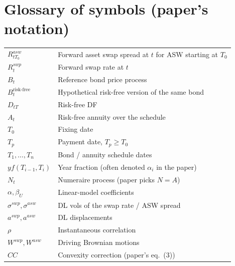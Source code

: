 \documentclass[11pt,a4paper]{article}
\begin{document}
\section{Glossary of symbols (paper's notation)}
\begin{tabular}{@{}p{3cm}p{12cm}@{}}
\toprule
$R^{asw}_{t T_0}$       & Forward asset swap spread at $t$ for ASW starting at $T_0$ \\
$R^{swp}_t$             & Forward swap rate at $t$ \\
$B_t$                   & Reference bond price process \\
$B^{\text{risk-free}}_t$ & Hypothetical risk-free version of the same bond \\
$D_{tT}$                & Risk-free DF \\
$A_t$                   & Risk-free annuity over the schedule \\
$T_0$                   & Fixing date \\
$T_p$                   & Payment date, $T_p \ge T_0$ \\
$T_1, \ldots, T_n$      & Bond / annuity schedule dates \\
$yf(T_{i-1}, T_i)$      & Year fraction (often denoted $\alpha_i$ in the paper) \\
$N_t$                   & Numeraire process (paper picks $N = A$) \\
$\alpha, \beta_U$       & Linear-model coefficients \\
$\sigma^{swp}, \sigma^{asw}$ & DL vols of the swap rate / ASW spread \\
$a^{swp}, a^{asw}$      & DL displacements \\
$\rho$                  & Instantaneous correlation \\
$W^{swp}, W^{asw}$      & Driving Brownian motions \\
$CC$                    & Convexity correction (paper's eq.~(3)) \\
\bottomrule
\end{tabular}
\end{document}
